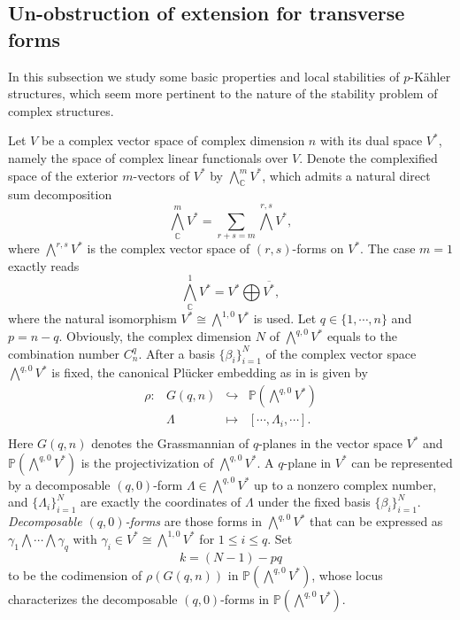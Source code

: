 \documentclass[12pt]{amsart}
\numberwithin{equation}{section}
\renewcommand{\1}{\mathds{1}}
\renewcommand{\>}{\rightarrow}
\begin{document}
\subsection{Un-obstruction of extension for transverse forms}\label{p-kahler}
In this subsection we study some basic properties and local stabilities of $p$-K\"ahler
structures, which seem more pertinent to the
nature of the stability problem of complex structures.

Let $V$ be a complex vector space of complex dimension $n$ with its
dual space $V^{*}$, namely the space of complex linear functionals
over $V$. Denote the complexified space of the exterior $m$-vectors
of $V^{*}$ by $\bigwedge^{m}_{\mathbb{C}} V^{*}$, which admits a
natural direct sum decomposition
\[ \bigwedge^{m}_{\mathbb{C}} V^{*} = \sum_{r+s=m} \bigwedge^{r,s} V^*, \]
where $\bigwedge^{r,s} V^*$ is the complex vector space
of $(r,s)$-forms on $V^*$.
The case $m=1$ exactly reads \[ \bigwedge^{1}_{\mathbb{C}} V^{*} =
V^* \bigoplus \overline{V^{*}},\] where the natural isomorphism $V^*
\cong \bigwedge^{1,0}V^*$ is used. Let $q\in \{1, \cdots, n\}$ and $p=n-q$. Obviously, the complex dimension
$N$ of $\bigwedge^{q,0}V^*$ equals to the combination number $C^{q}_n$. After a basis $\{
\beta_i \}_{i=1}^N$ of the complex vector space $\bigwedge^{q,0}V^*$ is fixed,
the canonical Pl\"ucker embedding as in \cite[Page 209]{GH} is given
by
$$\begin{array}{cccc}
\rho: & G(q,n) & \hookrightarrow & \mathbb{P}(\bigwedge^{q,0}V^*) \\
      & \Lambda & \mapsto & [\cdots,\Lambda_{i},\cdots]. \\
\end{array} $$
Here $G(q,n)$ denotes the Grassmannian of $q$-planes in the vector
space $V^*$ and $\mathbb{P}(\bigwedge^{q,0}V^*)$ is the
projectivization of $\bigwedge^{q,0}V^*$. A $q$-plane in $V^*$ can
be represented by a decomposable $(q,0)$-form $\Lambda \in
\bigwedge^{q,0}V^*$ up to a nonzero complex number, and
$\{\Lambda_i\}_{i=1}^N$ are exactly the coordinates of $\Lambda$
under the fixed basis $\{ \beta_i \}_{i=1}^N$. \emph{Decomposable
$(q,0)$-forms} are those forms in $ \bigwedge^{q,0}V^*$ that can be
expressed as $\gamma_1 \bigwedge \cdots \bigwedge \gamma_q$ with
$\gamma_i \in V^* \cong \bigwedge^{1,0}V^*$ for $1 \leq i \leq q$.
Set
\begin{equation}\label{knpq}
k=(N-1)-pq
\end{equation} to be the codimension of $\rho(G(q,n))$ in
$\mathbb{P}(\bigwedge^{q,0}V^*)$, whose locus characterizes the
decomposable $(q,0)$-forms in $\mathbb{P}(\bigwedge^{q,0}V^*)$.
\end{document}
